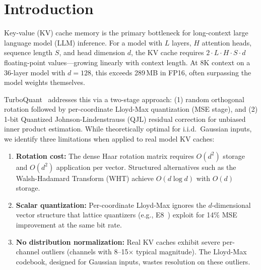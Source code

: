 \documentclass[sigconf,anonymous,review]{acmart}
\begin{document}
\maketitle

\section{Introduction}
\label{sec:intro}

Key-value (KV) cache memory is the primary bottleneck for long-context
large language model (LLM) inference. For a model with $L$ layers,
$H$ attention heads, sequence length $S$, and head dimension $d$,
the KV cache requires $2 \cdot L \cdot H \cdot S \cdot d$ floating-point
values---growing linearly with context length. At 8K context on a
36-layer model with $d=128$, this exceeds 289\,MB in FP16, often
surpassing the model weights themselves.

TurboQuant~\cite{turboquant2026} addresses this via a two-stage approach:
(1) random orthogonal rotation followed by per-coordinate Lloyd-Max
quantization (MSE stage), and (2) 1-bit Quantized Johnson-Lindenstrauss
(QJL) residual correction for unbiased inner product estimation.
While theoretically optimal for i.i.d.\ Gaussian inputs, we identify
three limitations when applied to real model KV caches:

\begin{enumerate}[nosep,leftmargin=*]
  \item \textbf{Rotation cost:} The dense Haar rotation matrix requires
        $O(d^2)$ storage and $O(d^2)$ application per vector. Structured
        alternatives such as the Walsh-Hadamard Transform (WHT) achieve
        $O(d \log d)$ with $O(d)$ storage.
  \item \textbf{Scalar quantization:} Per-coordinate Lloyd-Max ignores
        the $d$-dimensional vector structure that lattice quantizers
        (e.g., E8~\cite{conwaysloane}) exploit for 14\% MSE improvement
        at the same bit rate.
  \item \textbf{No distribution normalization:} Real KV caches exhibit
        severe per-channel outliers (channels with 8--15$\times$ typical
        magnitude). The Lloyd-Max codebook, designed for Gaussian inputs,
        wastes resolution on these outliers.
\end{enumerate}
\end{document}
